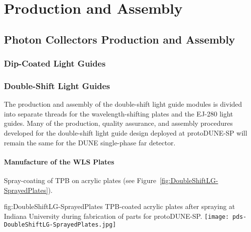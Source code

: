 \section{Production and Assembly}
\label{sec:fdsp-pd-prod-assy}

\subsection{Photon Collectors Production and Assembly}
\label{sec:fdsp-pd-prod-pc}
	
\subsubsection{\color{red}\bf Dip-Coated Light Guides}
\label{ssec:fdsp-pd-pc-prod-bar1}

\subsubsection{Double-Shift Light Guides}
\label{ssec:fdsp-pd-pc-prod-bar2}

The production and assembly of the double-shift light guide modules is divided 
into separate threads for the wavelength-shifting plates and the EJ-280 light guides. 
Many of the production, quality assurance, and assembly procedures developed for the
 double-shift light guide design deployed at protoDUNE-SP will remain the same for 
the DUNE single-phase far detector.

\paragraph*{Manufacture of the WLS Plates}

Spray-coating of TPB on acrylic plates (see Figure~\ref{fig:DoubleShiftLG-SprayedPlates}).

\begin{dunefigure}{fig:DoubleShiftLG-SprayedPlates}
 {TPB-coated acrylic plates after spraying at Indiana University during fabrication of parts for protoDUNE-SP.}
  \texttt{[image: pds-DoubleShiftLG-SprayedPlates.jpg]}
\end{dunefigure}


